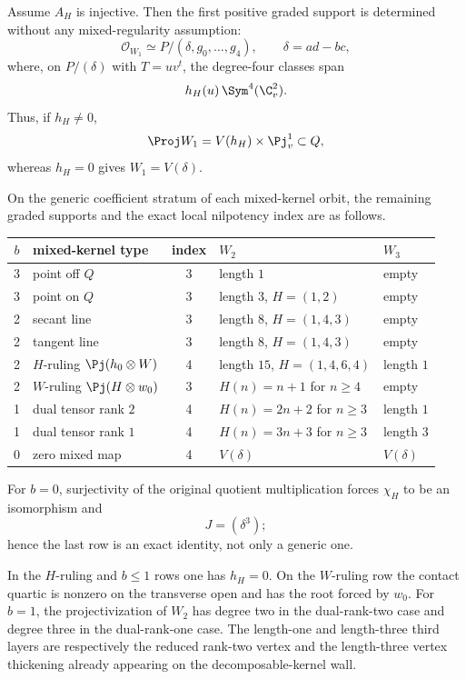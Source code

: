 \begin{theorem}
\label{thm:corank-two-mixed-kernel-atlas}
Assume \(A_H\) is injective.  Then the first positive graded support
is determined without any mixed-regularity assumption:
\begin{equation}\label{eq:W1-all-Ainj}
 \mathcal O_{W_1}
 \simeq
 P/(\delta,g_0,\ldots,g_4),
 \qquad \delta=ad-bc,
\end{equation}
where, on \(P/(\delta)\) with \(T=uv^t\), the degree-four classes
span
\[
 h_H(u)\,\Sym^4(\C^2_v).
\]
Thus, if \(h_H\ne0\),
\[
 \Proj W_1=V(h_H)\times\Pj^1_v\subset Q,
\]
whereas \(h_H=0\) gives \(W_1=V(\delta)\).

On the generic coefficient stratum of each mixed-kernel orbit, the
remaining graded supports and the exact local nilpotency index are as
follows.
\begin{center}
\small
\begin{tabular}{@{}c l c l l@{}}
\toprule
\(b\)&mixed-kernel type&index&\(W_2\)&\(W_3\)\\
\midrule
3&point off \(Q\)&3&length \(1\)&empty\\
3&point on \(Q\)&3&length \(3\), \(H=(1,2)\)&empty\\
2&secant line&3&length \(8\), \(H=(1,4,3)\)&empty\\
2&tangent line&3&length \(8\), \(H=(1,4,3)\)&empty\\
2&\(H\)-ruling \(\Pj(h_0\otimes W)\)&4&length \(15\), \(H=(1,4,6,4)\)&length \(1\)\\
2&\(W\)-ruling \(\Pj(H\otimes w_0)\)&3&
 \(H(n)=n+1\) for \(n\ge4\)&empty\\
1&dual tensor rank \(2\)&4&
 \(H(n)=2n+2\) for \(n\ge3\)&length \(1\)\\
1&dual tensor rank \(1\)&4&
 \(H(n)=3n+3\) for \(n\ge3\)&length \(3\)\\
0&zero mixed map&4&\(V(\delta)\)&\(V(\delta)\)\\
\bottomrule
\end{tabular}
\end{center}
For \(b=0\), surjectivity of the original quotient multiplication
forces \(\chi_H\) to be an isomorphism and
\begin{equation}\label{eq:b0-delta3}
 J=(\delta^3);
\end{equation}
hence the last row is an exact identity, not only a generic one.

In the \(H\)-ruling and \(b\le1\) rows one has \(h_H=0\).  On the
\(W\)-ruling row the contact quartic is nonzero on the transverse open
and has the root forced by \(w_0\).
For \(b=1\), the projectivization of \(W_2\) has degree two in the
dual-rank-two case and degree three in the dual-rank-one case.  The
length-one and length-three third layers are respectively the reduced
rank-two vertex and the length-three vertex thickening already
appearing on the decomposable-kernel wall.
\end{theorem}

